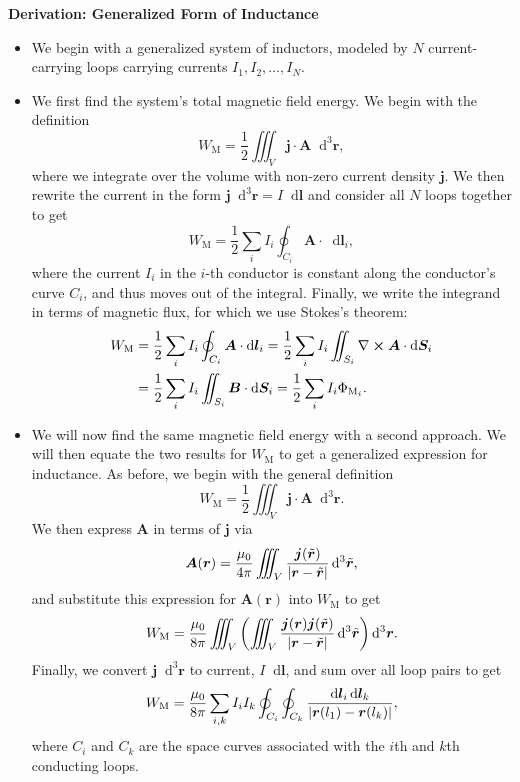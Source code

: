 \documentclass[11pt, a4paper]{article}
\newcommand{\diff}{\mathop{}\!\mathrm{d}} %
\newcommand{\dr}{\diff^{3} \r}  %
\newcommand{\dtr}{\diff^{3} \tilde{\r}}  %
\renewcommand{\vec}[1]{\bm{#1}} %
\renewcommand{\t}[1]{\tilde{#1}} %
\renewcommand{\r}{\vec{r}}
\newcommand{\B}{\vec{B}} %
\newcommand{\A}{\vec{A}} %
\newcommand{\mm}{\mu_{0}}  %
\renewcommand{\j}{\vec{j}}  %
\renewcommand{\curl}{\nabla \cross}
\begin{document}
\textbf{Derivation: Generalized Form of Inductance}
\begin{itemize}

	\item We begin with a generalized system of inductors, modeled by $ N $ current-carrying loops carrying currents $ I_{1}, I_{2}, \ldots, I_{N} $.
	
	\item We first find the system's total magnetic field energy. We begin with the definition
	\begin{equation*}
		W_{\text{M}} = \frac{1}{2}\iiint_{V}\j \cdot \A \dr,
	\end{equation*}
	where we integrate over the volume with non-zero current density $ \j $. We then rewrite the current in the form $ \j \dr = I \diff \vec{l} $ and consider all $ N $ loops together to get
	\begin{equation*}
		W_{\text{M}} = \frac{1}{2}\sum_{i}I_{i}\oint_{C_{i}} \A \cdot \diff \vec{l}_{i},
	\end{equation*}
	where the current $ I_{i} $ in the $ i $-th conductor is constant along the conductor's curve $ C_{i} $, and thus moves out of the integral. Finally, we write the integrand in terms of magnetic flux, for which we use Stokes's theorem:
	\begin{align*}
        W_{\text{M}} &= \frac{1}{2}\sum_{i}I_{i}\oint_{C_{i}} \A \cdot \diff \vec{l}_{i} = \frac{1}{2}\sum_{i}I_{i}\iint_{S_{i}} \curl \A \cdot \diff \vec{S}_{i} \\
        &= \frac{1}{2}\sum_{i}I_{i}\iint_{S_{i}} \B \cdot \diff \vec{S}_{i} = \frac{1}{2}\sum_{i}I_{i} \Phi_{\text{M}_{i}}.
	\end{align*}
	
	\item We will now find the same magnetic field energy with a second approach. We will then equate the two results for $ W_{\text{M}} $ to get a generalized expression for inductance. As before, we begin with the general definition
	\begin{equation*}
		W_{\text{M}} = \frac{1}{2}\iiint_{V} \j \cdot \A \dr.
	\end{equation*}
	We then express $ \A $ in terms of $ \j $ via
	\begin{equation*}
		\A(\r) = \frac{\mm}{4\pi}\iiint_{V}\frac{\j(\t{\r})}{\abs{\r - \t{\r}}}\dtr,
	\end{equation*}
    and substitute this expression for $ \A(\r) $ into $ W_{\text{M}} $ to get
	\begin{equation*}
		W_{\text{M}} = \frac{\mm}{8\pi}\iiint_{V} \left(\iiint_{V}\frac{\j(\r)\j(\t{\r})}{\abs{\r - \t{\r}}}\dtr\right)\dr.
	\end{equation*}
	Finally, we convert $ \j \dr $ to current, $ I \diff \vec{l} $, and sum over all loop pairs to get
	\begin{equation*}
		W_{\text{M}} = \frac{\mm}{8\pi}\sum_{i, k}I_{i}I_{k}\oint_{C_{i}}\oint_{C_{k}}\frac{\diff \vec{l}_{i}\diff \vec{l}_{k}}{\abs{\r(l_{1}) - \r(l_{k})}},
	\end{equation*}
	where $ C_{i} $ and $ C_{k} $ are the space curves associated with the $ i $th and $ k $th conducting loops.
	

\end{itemize}
\end{document}
